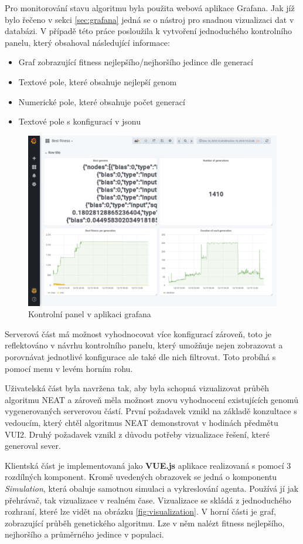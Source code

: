 Pro monitorování stavu algoritmu byla použita webová aplikace Grafana. Jak jíž bylo řečeno v sekci \ref{sec:grafana} jedná se o nástroj pro snadnou vizualizaci dat v databázi. V případě této práce posloužila k vytvoření jednoduchého kontrolního panelu, který obsahoval následující informace:
\begin{itemize}
	\item Graf zobrazující fitness nejlepšího/nejhoršího jedince dle generací
	\item Textové pole, které obsahuje nejlepší genom
	\item Numerické pole, které obsahuje počet generací
	\item Textové pole s konfigurací v jsonu
\end{itemize}
\begin{figure}[H]
	\centering
	\includegraphics[width=0.6\linewidth]{grafana}
	\caption{Kontrolní panel v aplikaci grafana}
	\label{fig:grafana}
\end{figure}

Serverová část má možnost vyhodnocovat více konfigurací zároveň, toto je reflektováno v návrhu kontrolního panelu, který umožňuje nejen zobrazovat a porovnávat jednotlivé konfigurace ale také dle nich filtrovat. Toto probíhá s pomocí menu v levém horním rohu.

Uživatelská část byla navržena tak, aby byla schopná vizualizovat průběh algoritmu NEAT a zároveň měla možnost znovu vyhodnocení existujících genomů vygenerovaných serverovou částí. První požadavek vznikl na základě konzultace s vedoucím, který chtěl algoritmus NEAT demonstrovat v hodinách předmětu VUI2. Druhý požadavek vznikl z důvodu potřeby vizualizace řešení, které generoval sever.

Klientská část je implementovaná jako \textbf{VUE.js} aplikace realizovaná s pomocí 3 rozdílných komponent. Kromě uvedených obrazovek se jedná o komponentu \emph{Simulation}, která obaluje samotnou simulaci a vykreslování agenta. Používá jí jak přehrávač, tak vizualizace v realném čase.
Vizualizace se skládá z jednoduchého rozhraní, které lze vidět na obrázku \ref{fig:visualization}. V horní části je graf, zobrazující průběh genetického algoritmu. Lze v něm nalézt fitness nejlepšího, nejhoršího a průměrného jedince v populaci.


